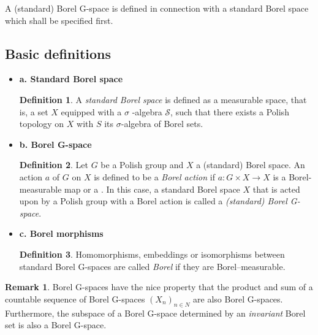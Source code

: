 \documentclass[12pt]{article}
\theoremstyle{plain}
\theoremstyle{definition}
\newtheorem{definition}{Definition}[section]
\newtheorem{remark}{Remark}[section]
\numberwithin{equation}{section}
\begin{document}
A (standard) Borel G-space is defined in connection with a standard Borel space which shall be
specified first.

\subsection{Basic definitions}
\begin{itemize}
\item {\bf a. Standard Borel space}
\begin{definition}
 A \emph{standard Borel space} is defined as a measurable space, that is, a set $X$ equipped with a $\sigma$ -algebra $\mathcal{S}$, such that there exists a Polish topology on $X$ with $S$ its $\sigma$-algebra of Borel sets. 
\end{definition}
\item {\bf b. Borel G-space}
\begin{definition}
 Let $G$ be a Polish group and $X$ a (standard) Borel space.  An action $a$ of $G$ on $X$ is 
defined to be a \emph{Borel action} if $a: G \times X \to X$ is a Borel-measurable map or a 
.
In this case, a standard Borel space $X$ that is acted upon by a Polish group with a Borel action
is called a \emph{(standard) Borel G-space}. 
\end{definition}
\item {\bf c. Borel morphisms}

\begin{definition}
 Homomorphisms, embeddings or isomorphisms between standard Borel G-spaces 
are called \emph{Borel} if they are Borel--measurable. 
\end{definition}

\end{itemize}

\begin{remark}
Borel G-spaces have the nice property that the product and sum of a countable sequence of Borel G-spaces 
$(X_n)_{n \in N}$ are also Borel G-spaces. Furthermore, the subspace of a Borel G-space determined by an 
{\em invariant} Borel set is also a Borel G-space.
\end{remark}
 



\end{document}
